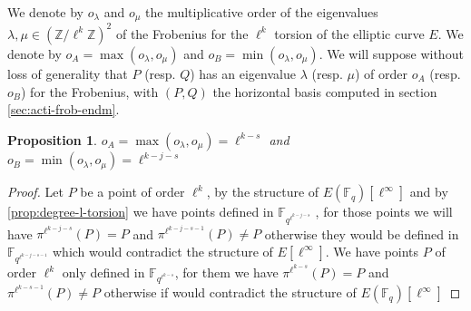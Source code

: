 \documentclass{lms}
\newcommand{\todo}[1]{{\color{red}TODO: #1}}
\newtheorem{prop}[thm]{Proposition}
\begin{document}
\begin{defi}
We denote by $o_{\lambda}$ and $o_{\mu}$ the multiplicative order of the
eigenvalues $\lambda , \mu \in (\mathbb{Z}/\ell^k\mathbb{Z})^2$ of the Frobenius for the
$\ell^{k}$ torsion of the elliptic curve $E$.
\newline
We denote by $o_A=\max(o_{\lambda},o_{\mu})$ and $o_B=\min(o_{\lambda},o_{\mu})$.
We will suppose without loss of generality that $P$ (resp. $Q$) has an eigenvalue $\lambda$ (resp. $\mu$) of order $o_A$ (resp. $o_B$) for the Frobenius, with $(P,Q)$ the horizontal basis computed in section \ref{sec:acti-frob-endm}.
\end{defi}

\begin{prop}
$o_A=\max(o_{\lambda},o_{\mu}) = \ell^{k-s}$ and $o_B=\min(o_{\lambda},o_{\mu}) = \ell^{k-j-s}$
\end{prop}

\begin{proof}

 Let $P$ be a point of order $\ell^k$, by the structure of $E(\mathbb{F}_q)[\ell^{\infty}]$ and by \ref{prop:degree-l-torsion} we have points defined in $\mathbb{F}_{q^{\ell^{k-j-s}}}$ , for those points we will have $\pi^{\ell^{k-j-s}}(P)=P$ and $\pi^{\ell^{k-j-s-1}}(P) \neq P$ otherwise they would be defined in $\mathbb{F}_{q^{\ell^{k-j-s-1}}}$ which would contradict the structure of $E[\ell^{\infty}]$. We have points $P$ of order $\ell^k$ only defined in $\mathbb{F}_{q^{\ell^{k-s}}}$, for them we have $\pi^{\ell^{k-s}}(P)=P$ and $\pi^{\ell^{k-s-1}}(P) \neq P$ otherwise if would contradict the structure of $E(\mathbb{F}_q)[\ell^{\infty}]$
\end{proof}
\end{document}
